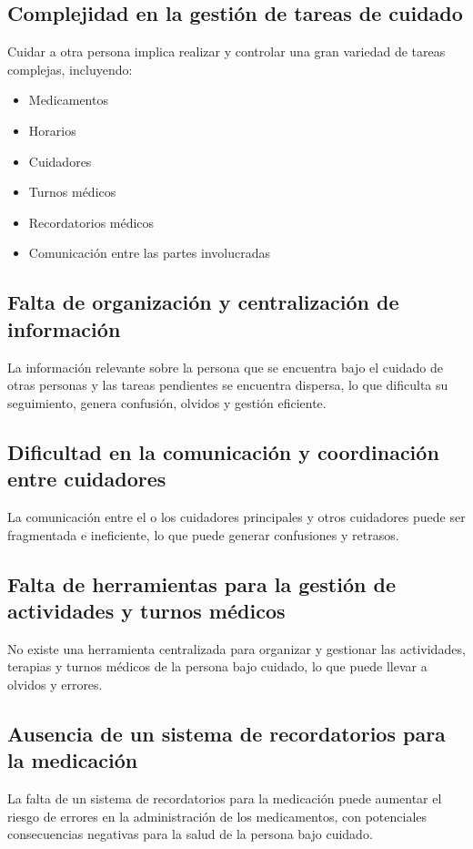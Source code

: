 \documentclass[a4paper,12pt]{article}
\begin{document}
    \subsection{Complejidad en la gestión de tareas de cuidado}
    \par Cuidar a otra persona implica realizar y controlar una gran variedad de tareas complejas, incluyendo:
    \begin{itemize}
        \item Medicamentos
        \item Horarios
        \item Cuidadores
        \item Turnos médicos
        \item Recordatorios médicos
        \item Comunicación entre las partes involucradas
    \end{itemize}
    \subsection{Falta de organización y centralización de información}
    \par La información relevante sobre la persona que se encuentra bajo el cuidado de otras personas y las tareas pendientes se encuentra dispersa, lo que dificulta su seguimiento, genera confusión, olvidos y gestión eficiente.
    \subsection{Dificultad en la comunicación y coordinación entre cuidadores}
    \par La comunicación entre el o los cuidadores principales y otros cuidadores puede ser fragmentada e ineficiente, lo que puede generar confusiones y retrasos.
    \subsection{Falta de herramientas para la gestión de actividades y turnos médicos}
    \par No existe una herramienta centralizada para organizar y gestionar las actividades, terapias y turnos médicos de la persona bajo cuidado, lo que puede llevar a olvidos y errores.
    \subsection{Ausencia de un sistema de recordatorios para la medicación}
    \par La falta de un sistema de recordatorios para la medicación puede aumentar el riesgo de errores en la administración de los medicamentos, con potenciales consecuencias negativas para la salud de la persona bajo cuidado.
\end{document}
